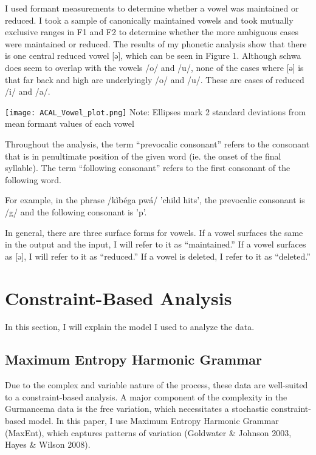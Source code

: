 \documentclass[output=paper,
modfonts
]{langscibook}
\begin{document}
I used formant measurements to determine whether a vowel was maintained or reduced. I took a sample of canonically maintained vowels and took mutually exclusive ranges in F1 and F2 to determine whether the more ambiguous cases were maintained or reduced. The results of my phonetic analysis show that there is one central reduced vowel [ə], which can be seen in Figure 1. Although schwa does seem to overlap with the vowels /o/ and /u/, none of the cases where [ə] is that far back and high are underlyingly /o/ and /u/. These are cases of reduced /i/ and /a/.

\pagebreak

\begin{center} 
\texttt{[image: ACAL\_Vowel\_plot.png]}
  Note: Ellipses mark 2 standard deviations from mean formant values of each vowel
  \end{center}
 

Throughout the analysis, the term “prevocalic consonant” refers to the consonant that is in penultimate position of the given word (ie. the onset of the final syllable). The term “following consonant” refers to the first consonant of the following word. 

For example, in the phrase /kìbéga pwá/ 'child hits', the prevocalic consonant is /g/ and the following consonant is 'p'. 

In general, there are three surface forms for vowels. If a vowel surfaces the same in the output and the input, I will refer to it as “maintained.” If a vowel surfaces as [ə], I will refer to it as “reduced.” If a vowel is deleted, I refer to it as “deleted.”

\section{Constraint-Based Analysis}
In this section, I will explain the model I used to analyze the data. 

\subsection{Maximum Entropy Harmonic Grammar}

Due to the complex and variable nature of the process, these data are well-suited to a constraint-based analysis. A major component of the complexity in the Gurmancema data is the free variation, which necessitates a stochastic constraint-based model. In this paper, I use Maximum Entropy Harmonic Grammar (MaxEnt), which captures patterns of variation (Goldwater \& Johnson 2003, Hayes \& Wilson 2008). 
	 
\end{document}
